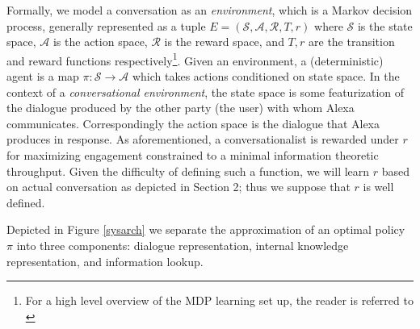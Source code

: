 \documentclass{article} %
\theoremstyle{named}
\def\scripta{{\mathcal A}}
\def\scriptr{{\mathcal R}}
\def\scripts{{\mathcal S}}
\begin{document}
Formally, we model a conversation as an \emph{environment}, which is a Markov decision process, generally represented as a tuple $ E = (\scripts, \scripta, \scriptr, T, r)$ where $ \scripts $ is the state space, $ \scripta $ is the action space, $ \scriptr $ is the reward space, and $ T, r $ are the transition and reward functions respectively\footnote{For a high level overview of the MDP learning set up, the reader is referred to \cite{Bel}}. Given an environment, a (deterministic) agent is a map $ \pi: \scripts \to \scripta $ which takes actions conditioned on state space. In the context of a \emph{conversational environment}, the state space is some featurization of the dialogue produced by the other party (the user) with whom Alexa communicates. Correspondingly the action space is the dialogue that Alexa produces in response. As aforementioned, a conversationalist is rewarded under $ r $ for maximizing engagement constrained to a minimal information theoretic throughput. Given the difficulty of defining such a function, we will learn $ r $ based on actual conversation as depicted in Section 2; thus we suppose that $ r $ is well defined.

Depicted in Figure \ref{sysarch} we separate the approximation of an optimal policy $ \pi $ into three components: dialogue representation, internal knowledge representation, and information lookup.
\end{document}
